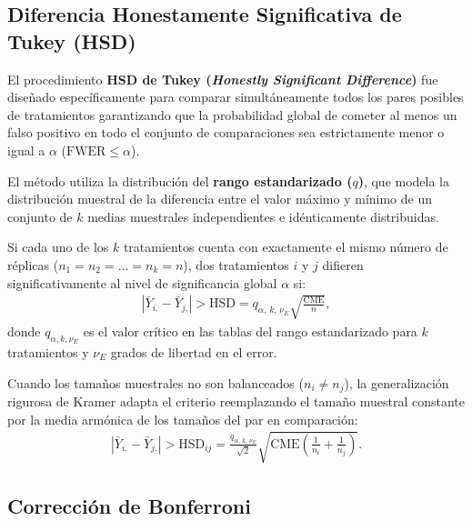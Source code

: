 \subsection*{Diferencia Honestamente Significativa de Tukey (HSD)}

El procedimiento \textbf{HSD de Tukey (\emph{Honestly Significant Difference})} fue diseñado específicamente para comparar simultáneamente todos los pares posibles de tratamientos garantizando que la probabilidad global de cometer al menos un falso positivo en todo el conjunto de comparaciones sea estrictamente menor o igual a $\alpha$ ($\text{FWER} \leq \alpha$).

El método utiliza la distribución del \textbf{rango estandarizado ($q$)}, que modela la distribución muestral de la diferencia entre el valor máximo y mínimo de un conjunto de $k$ medias muestrales independientes e idénticamente distribuidas.

\begin{teorema}
	Si cada uno de los $k$ tratamientos cuenta con exactamente el mismo número de réplicas ($n_1 = n_2 = \ldots = n_k = n$), dos tratamientos $i$ y $j$ difieren significativamente al nivel de significancia global $\alpha$ si:
	\begin{align}
		|\bar{Y}_{i.} - \bar{Y}_{j.}| > \text{HSD} = q_{\alpha, \, k, \, \nu_E} \sqrt{\frac{\text{CME}}{n}},
		\label{eq:tukey_hsd}
	\end{align}
	donde $q_{\alpha, k, \nu_E}$ es el valor crítico en las tablas del rango estandarizado para $k$ tratamientos y $\nu_E$ grados de libertad en el error.
\end{teorema}

\begin{teorema}
	Cuando los tamaños muestrales no son balanceados ($n_i \neq n_j$), la generalización rigurosa de Kramer adapta el criterio reemplazando el tamaño muestral constante por la media armónica de los tamaños del par en comparación:
	\begin{align}
		|\bar{Y}_{i.} - \bar{Y}_{j.}| > \text{HSD}_{ij} = \frac{q_{\alpha, \, k, \, \nu_E}}{\sqrt{2}} \sqrt{\text{CME} \left( \frac{1}{n_i} + \frac{1}{n_j} \right)}.
	\end{align}
\end{teorema}

\subsection*{Corrección de Bonferroni}

